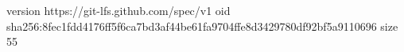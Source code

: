 version https://git-lfs.github.com/spec/v1
oid sha256:8fec1fdd4176ff5f6ca7bd3af44be61fa9704ffe8d3429780df92bf5a9110696
size 55
